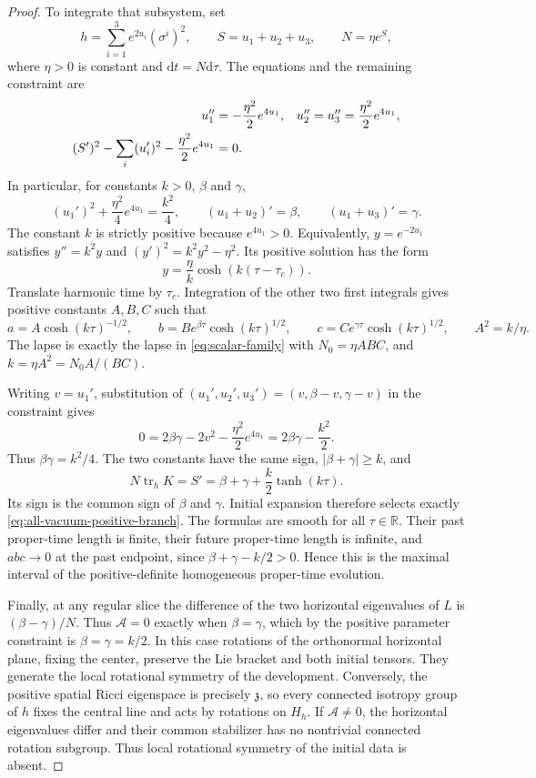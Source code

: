 \documentclass[10pt,a4paper]{article}
\numberwithin{equation}{section}
\theoremstyle{definition}
\theoremstyle{remark}
\newcommand{\dd}{\mathrm d}
\begin{document}
\begin{proof}
To integrate that subsystem, set
\[
 h=\sum_{i=1}^3e^{2u_i}(\sigma^i)^2,\qquad
 S=u_1+u_2+u_3,\qquad N=\eta e^S,
\]
where $\eta>0$ is constant and $\dd t=N\dd\tau$.
The equations and the remaining constraint are
\begin{align}
 u_1''&=-\frac{\eta^2}{2}e^{4u_1},&
 u_2''=u_3''&=\frac{\eta^2}{2}e^{4u_1},\notag\\
 (S')^2-\sum_i(u_i')^2-\frac{\eta^2}{2}e^{4u_1}&=0.
 \label{eq:all-vacuum-harmonic-system}
\end{align}
In particular, for constants $k>0$, $\beta$ and $\gamma$,
\begin{equation}
 (u_1')^2+\frac{\eta^2}{4}e^{4u_1}=\frac{k^2}{4},
 \qquad (u_1+u_2)'=\beta,\qquad
 (u_1+u_3)'=\gamma.
 \label{eq:all-vacuum-first-integrals}
\end{equation}
The constant $k$ is strictly positive because $e^{4u_1}>0$.
Equivalently, $y=e^{-2u_1}$ satisfies
$y''=k^2y$ and $(y')^2=k^2y^2-\eta^2$.
Its positive solution has the form
\[
 y=\frac{\eta}{k}\cosh(k(\tau-\tau_c)).
\]
Translate harmonic time by $\tau_c$.  Integration of the other two
first integrals gives positive constants $A,B,C$ such that
\[
 a=A\cosh(k\tau)^{-1/2},\qquad
 b=Be^{\beta\tau}\cosh(k\tau)^{1/2},\qquad
 c=Ce^{\gamma\tau}\cosh(k\tau)^{1/2},
 \qquad A^2=k/\eta.
\]
The lapse is exactly the lapse in \eqref{eq:scalar-family} with
$N_0=\eta ABC$, and
$k=\eta A^2=N_0A/(BC)$.

Writing $v=u_1'$, substitution of
$(u_1',u_2',u_3')=(v,\beta-v,\gamma-v)$ in the constraint gives
\[
 0=2\beta\gamma-2v^2-\frac{\eta^2}{2}e^{4u_1}
   =2\beta\gamma-\frac{k^2}{2}.
\]
Thus $\beta\gamma=k^2/4$.  The two constants have the same sign,
$|\beta+\gamma|\ge k$, and
\[
 N\operatorname{tr}_hK=S'
 =\beta+\gamma+\frac{k}{2}\tanh(k\tau).
\]
Its sign is the common sign of $\beta$ and $\gamma$.  Initial
expansion therefore selects exactly
\eqref{eq:all-vacuum-positive-branch}.
The formulas are smooth for all $\tau\in\mathbb R$.
Their past proper-time length is finite, their future proper-time
length is infinite, and $abc\to0$ at the past endpoint, since
$\beta+\gamma-k/2>0$.
Hence this is the maximal interval of the positive-definite
homogeneous proper-time evolution.

Finally, at any regular slice the difference of the two horizontal
eigenvalues of $L$ is $(\beta-\gamma)/N$.
Thus $\mathcal A=0$ exactly when $\beta=\gamma$, which by the
positive parameter constraint is $\beta=\gamma=k/2$.
In this case rotations of the orthonormal horizontal plane, fixing
the center, preserve the Lie bracket and both initial tensors.
They generate the local rotational symmetry of the development.
Conversely, the positive spatial Ricci eigenspace is precisely
$\mathfrak z$, so every connected isotropy group of $h$ fixes
the central line and acts by rotations on $H_h$.
If $\mathcal A\ne0$, the horizontal eigenvalues differ and their
common stabilizer has no nontrivial connected rotation subgroup.
Thus local rotational symmetry of the initial data is absent.


\end{proof}
\end{document}

